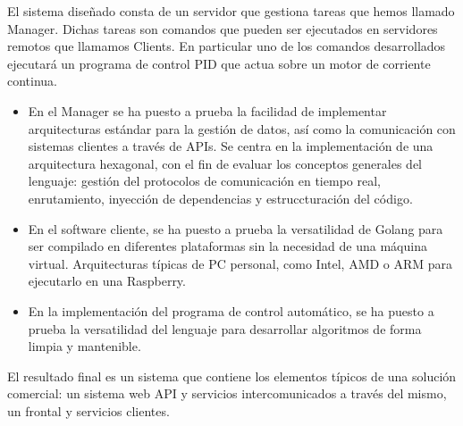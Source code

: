El sistema diseñado consta de un servidor que gestiona tareas que hemos llamado Manager. Dichas tareas son comandos que pueden ser ejecutados en servidores remotos que llamamos Clients. En particular uno de los comandos desarrollados ejecutará un programa de control PID que actua sobre un motor de corriente continua.

\begin{itemize}
    \item En el Manager se ha puesto a prueba la facilidad de implementar arquitecturas estándar para la gestión de datos, así como la comunicación con sistemas clientes a través de APIs. Se centra en la implementación de una arquitectura hexagonal, con el fin de evaluar los conceptos generales del lenguaje: gestión del protocolos de comunicación en tiempo real, enrutamiento, inyección de dependencias y estruccturación del código.
    \item En el software cliente, se ha puesto a prueba la versatilidad de Golang para ser compilado en diferentes plataformas sin la necesidad de una máquina virtual. Arquitecturas típicas de PC personal, como Intel, AMD o ARM para ejecutarlo en una Raspberry.
    \item  En la implementación del programa de control automático, se ha puesto a prueba la versatilidad del lenguaje para desarrollar algoritmos de forma limpia y mantenible.
\end{itemize}

El resultado final es un sistema que contiene los elementos típicos de una solución comercial: un sistema web API y servicios intercomunicados a través del mismo, un frontal y servicios clientes.


